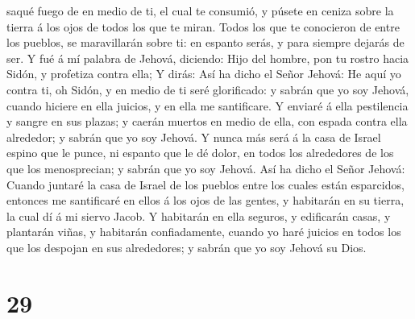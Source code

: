 saqué fuego de en medio de ti, el cual te consumió, y púsete en ceniza
sobre la tierra á los ojos de todos los que te miran. 
Todos los que te conocieron de entre los pueblos, se maravillarán sobre
ti: en espanto serás, y para siempre dejarás de ser.  Y
fué á mí palabra de Jehová, diciendo:  Hijo del hombre,
pon tu rostro hacia Sidón, y profetiza contra ella;  Y
dirás: Así ha dicho el Señor Jehová: He aquí yo contra ti, oh Sidón, y
en medio de ti seré glorificado: y sabrán que yo soy Jehová, cuando
hiciere en ella juicios, y en ella me santificare.  Y
enviaré á ella pestilencia y sangre en sus plazas; y caerán muertos en
medio de ella, con espada contra ella alrededor; y sabrán que yo soy
Jehová.  Y nunca más será á la casa de Israel espino que
le punce, ni espanto que le dé dolor, en todos los alrededores de los
que los menosprecian; y sabrán que yo soy Jehová.  Así ha
dicho el Señor Jehová: Cuando juntaré la casa de Israel de los pueblos
entre los cuales están esparcidos, entonces me santificaré en ellos á
los ojos de las gentes, y habitarán en su tierra, la cual dí á mi siervo
Jacob.  Y habitarán en ella seguros, y edificarán casas,
y plantarán viñas, y habitarán confiadamente, cuando yo haré juicios en
todos los que los despojan en sus alrededores; y sabrán que yo soy
Jehová su Dios.

\hypertarget{section-28}{%
\section{29}\label{section-28}}

